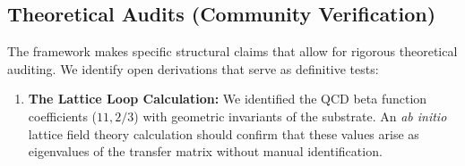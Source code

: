 \subsection{Theoretical Audits (Community Verification)}

The framework makes specific structural claims that allow for rigorous theoretical auditing. We identify open derivations that serve as definitive tests:

\begin{enumerate}
    \item \textbf{The Lattice Loop Calculation:} We identified the QCD beta function coefficients ($11, 2/3$) with geometric invariants of the substrate. An \textit{ab initio} lattice field theory calculation should confirm that these values arise as eigenvalues of the transfer matrix without manual identification.
\end{enumerate}